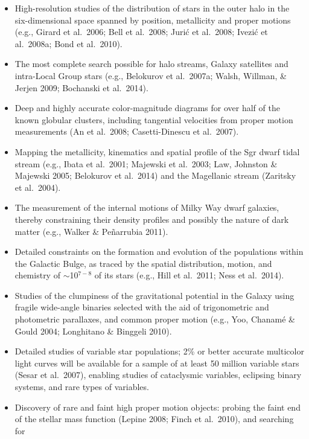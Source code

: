 \documentclass{emulateapj}
\begin{document}
\begin{itemize}
\item High-resolution studies of the distribution of stars in the outer halo
          in the six-dimensional space spanned by position, metallicity and proper
          motions (e.g., Girard et al.~2006; Bell et al.~2008; Juri\'{c} et al.~2008;
          Ivezi\'{c} et al.~2008a; Bond et al.~2010).
\item The most complete search possible for halo streams, Galaxy satellites and intra-Local Group 
          stars (e.g., Belokurov et al.~2007a; Walsh, Willman, \& Jerjen 2009; Bochanski et al.~2014).
\item Deep and highly accurate color-magnitude diagrams for over half of the known
          globular clusters, including tangential velocities from proper motion
          measurements (An et al.~2008; Casetti-Dinescu et al.~2007).
\item Mapping the metallicity, kinematics and spatial profile of the Sgr dwarf tidal
          stream (e.g., Ibata et al.~2001; Majewski et al.~2003; Law, Johnston \& Majewski 2005; Belokurov et al.~2014) 
          and the Magellanic stream (Zaritsky et al.~2004).
\item The measurement of the internal motions of Milky Way dwarf 
          galaxies, thereby constraining their density profiles and
	  possibly the nature of dark matter (e.g., Walker \&
	  Pe{\~n}arrubia 2011). 
\item Detailed constraints on the formation and evolution of the populations within the Galactic Bulge, as traced by the spatial 
          distribution, motion, and chemistry of $\sim$10$^{7-8}$ of its stars (e.g., Hill et al.~2011; Ness et al.~2014).
\item Studies of the clumpiness of the gravitational potential in the Galaxy using
          fragile wide-angle binaries selected with the aid of trigonometric and
          photometric parallaxes, and common proper motion (e.g., Yoo, Chanam\'{e} \& Gould 2004; Longhitano \& Binggeli 2010).
\item Detailed studies of variable star populations; 2\% or better accurate
          multicolor light curves will be available for a sample of at least 50
          million variable stars (Sesar et al.~2007), enabling studies of
          cataclysmic variables, eclipsing binary systems, and rare types of variables.
\item Discovery of rare and faint high proper motion objects: probing the
          faint end of the stellar mass function (Lepine 2008; Finch et al.~2010), and searching for

\end{itemize}
\end{document}
